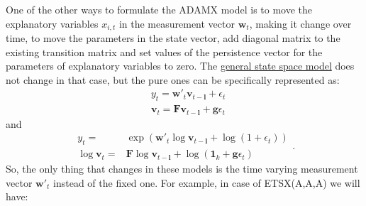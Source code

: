 \documentclass[
]{book}
\theoremstyle{definition}
\theoremstyle{definition}
\theoremstyle{definition}
\theoremstyle{definition}
\theoremstyle{remark}
\begin{document}
One of the other ways to formulate the ADAMX model is to move the explanatory variables \(x_{i,t}\) in the measurement vector \(\mathbf{w}_{t}\), making it change over time, to move the parameters in the state vector, add diagonal matrix to the existing transition matrix and set values of the persistence vector for the parameters of explanatory variables to zero. The \protect\hyperlink{ADAMETSIntroduction}{general state space model} does not change in that case, but the pure ones can be specifically represented as:
\begin{equation}
  \begin{aligned}
    & {y}_{t} = \mathbf{w}'_t \mathbf{v}_{t-\boldsymbol{l}} + \epsilon_t \\
    & \mathbf{v}_t = \mathbf{F} \mathbf{v}_{t-\boldsymbol{l}} + \mathbf{g} \epsilon_t
  \end{aligned}
  \label{eq:ETSXADAMStateSpacePureAdditiveFull}
\end{equation}
and
\begin{equation}
  \begin{aligned}
    {y}_{t} = & \exp\left(\mathbf{w}'_t \log \mathbf{v}_{t-\boldsymbol{l}} + \log(1 + \epsilon_t)\right) \\
    \log \mathbf{v}_t = & \mathbf{F} \log \mathbf{v}_{t-\boldsymbol{l}} + \log(\mathbf{1}_k + \mathbf{g} \epsilon_t)
  \end{aligned}. 
  \label{eq:ETSXADAMStateSpacePureMultiplicativeFull}
\end{equation}
So, the only thing that changes in these models is the time varying measurement vector \(\mathbf{w}'_t\) instead of the fixed one. For example, in case of ETSX(A,A,A) we will have:
\end{document}

